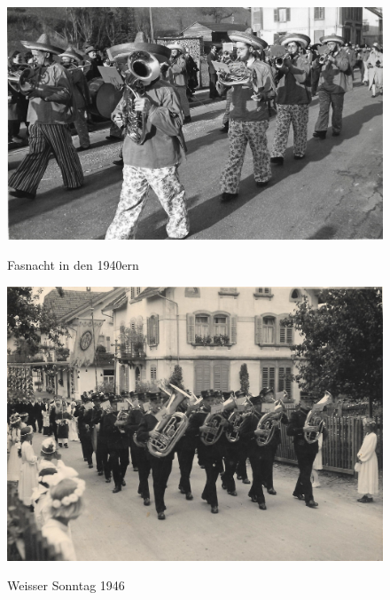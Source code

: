 \documentclass[openany]{book}
\begin{document}
\begin{figure}[ht]
    \centering
    \includegraphics{./chap/1925-1950/Fasnacht-1946.jpg}
    \label{fig:mgh-fasnacht-1940}
    \caption{Fasnacht in den 1940ern}
\end{figure}
\begin{figure}[ht]
    \centering
    \includegraphics{./chap/1925-1950/Weisser-Sontag-1946.jpg}
    \label{fig:mgh-weisssontag-prozession}
    \caption{Weisser Sonntag 1946}
\end{figure}
\clearpage
\end{document}
